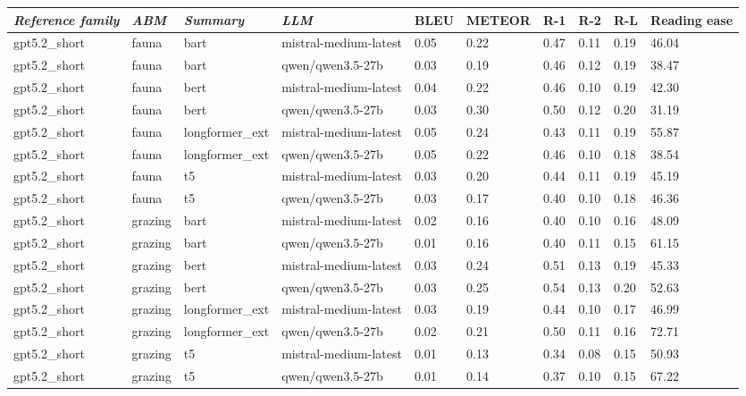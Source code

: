 \begin{tabular}{|l|l|l|l|l|l|l|l|l|l|}
\hline
\textit{\textbf{Reference family}} & \textit{\textbf{ABM}} & \textit{\textbf{Summary}} & \textit{\textbf{LLM}} & BLEU & METEOR & R-1 & R-2 & R-L & Reading ease \\
 \hline
 gpt5.2\_short & fauna & bart & mistral-medium-latest & 0.05 & 0.22 & 0.47 & 0.11 & 0.19 & 46.04 \\
 \hline
 gpt5.2\_short & fauna & bart & qwen/qwen3.5-27b & 0.03 & 0.19 & 0.46 & 0.12 & 0.19 & 38.47 \\
 \hline
 gpt5.2\_short & fauna & bert & mistral-medium-latest & 0.04 & 0.22 & 0.46 & 0.10 & 0.19 & 42.30 \\
 \hline
 gpt5.2\_short & fauna & bert & qwen/qwen3.5-27b & 0.03 & 0.30 & 0.50 & 0.12 & 0.20 & 31.19 \\
 \hline
 gpt5.2\_short & fauna & longformer\_ext & mistral-medium-latest & 0.05 & 0.24 & 0.43 & 0.11 & 0.19 & 55.87 \\
 \hline
 gpt5.2\_short & fauna & longformer\_ext & qwen/qwen3.5-27b & 0.05 & 0.22 & 0.46 & 0.10 & 0.18 & 38.54 \\
 \hline
 gpt5.2\_short & fauna & t5 & mistral-medium-latest & 0.03 & 0.20 & 0.44 & 0.11 & 0.19 & 45.19 \\
 \hline
 gpt5.2\_short & fauna & t5 & qwen/qwen3.5-27b & 0.03 & 0.17 & 0.40 & 0.10 & 0.18 & 46.36 \\
 \hline
 gpt5.2\_short & grazing & bart & mistral-medium-latest & 0.02 & 0.16 & 0.40 & 0.10 & 0.16 & 48.09 \\
 \hline
 gpt5.2\_short & grazing & bart & qwen/qwen3.5-27b & 0.01 & 0.16 & 0.40 & 0.11 & 0.15 & 61.15 \\
 \hline
 gpt5.2\_short & grazing & bert & mistral-medium-latest & 0.03 & 0.24 & 0.51 & 0.13 & 0.19 & 45.33 \\
 \hline
 gpt5.2\_short & grazing & bert & qwen/qwen3.5-27b & 0.03 & 0.25 & 0.54 & 0.13 & 0.20 & 52.63 \\
 \hline
 gpt5.2\_short & grazing & longformer\_ext & mistral-medium-latest & 0.03 & 0.19 & 0.44 & 0.10 & 0.17 & 46.99 \\
 \hline
 gpt5.2\_short & grazing & longformer\_ext & qwen/qwen3.5-27b & 0.02 & 0.21 & 0.50 & 0.11 & 0.16 & 72.71 \\
 \hline
 gpt5.2\_short & grazing & t5 & mistral-medium-latest & 0.01 & 0.13 & 0.34 & 0.08 & 0.15 & 50.93 \\
 \hline
 gpt5.2\_short & grazing & t5 & qwen/qwen3.5-27b & 0.01 & 0.14 & 0.37 & 0.10 & 0.15 & 67.22 \\

\end{tabular}
